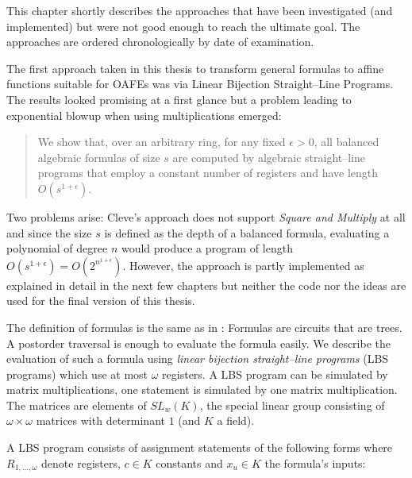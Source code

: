 \label{sec:discontinued}

This chapter shortly describes the approaches that have been investigated (and
implemented) but were not good enough to reach the ultimate goal. The approaches
are ordered chronologically by date of examination.


%
%
\label{sec:using-lbs}

The first approach taken in this thesis to transform general formulas to affine
functions suitable for OAFEs was via Linear Bijection Straight--Line Programs.
The results looked promising at a first glance but a problem leading to
exponential blowup when using multiplications emerged:

\begin{quote}
  We show that, over an arbitrary ring, for any fixed $\epsilon > 0$, all
  balanced algebraic formulas of size $s$ are computed by algebraic
  straight--line programs that employ a constant number of registers and have
  length $O(s^{1 + \epsilon})$.\cite{cleve91}
\end{quote}

\noindent{}Two problems arise: Cleve's approach does not support \emph{Square
and Multiply}\cite{knuth81} at all and since the size $s$ is defined as the
depth of a balanced formula, evaluating a polynomial of degree $n$ would produce
a program of length $O(s^{1 + \epsilon}) = O(2^{n^{1 + \epsilon}})$. However,
the approach is partly implemented as explained in detail in the next few
chapters but neither the code nor the ideas are used for the final version of
this thesis.

\label{sec:FormulasToMatrixMuls}

The definition of formulas is the same as in \cite{cleve91}: Formulas are
circuits that are trees. A postorder traversal is enough to evaluate the formula
easily. We describe the evaluation of such a formula using \emph{linear
bijection straight--line programs} (LBS programs)\cite{cleve91} which use at
most $\omega$ registers. A LBS program can be simulated by matrix
multiplications, one statement is simulated by one matrix multiplication. The
matrices are elements of $SL_w(K)$, the special linear group consisting of
$\omega \times \omega$ matrices with determinant $1$ (and $K$ a field).

A LBS program consists of assignment statements of the following
forms where $R_{1,...,\omega}$ denote registers, $c \in K$ constants and $x_u
\in K$ the formula's inputs:

